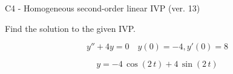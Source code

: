 \begin{exercise}
  \begin{exerciseTitle}C4 - Homogeneous second-order linear IVP (ver. 13)\end{exerciseTitle}
  \begin{exerciseStatement}
    
Find the solution to the given IVP.

    
\[y''+4y = 0 \hspace{1em} y(0) = -4 , y'(0) = 8\]

  \end{exerciseStatement}
  \begin{exerciseAnswer}
    
\[y= -4 \, \cos\left(2 \, t\right) + 4 \, \sin\left(2 \, t\right)\]

  \end{exerciseAnswer}
\end{exercise}